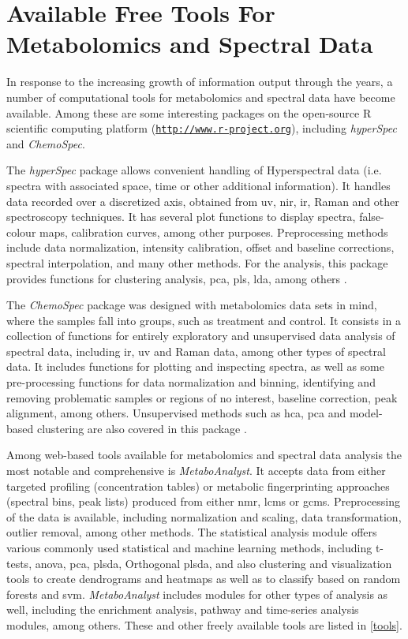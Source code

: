
\section{Available Free Tools For Metabolomics and Spectral Data} \label{met_tools}

In response to the increasing growth of information output through the years, a number of computational tools for metabolomics and spectral data have become available. Among these are some interesting packages on the open-source R scientific computing platform (\href{http://www.r-project.org}{\nolinkurl{http://www.r-project.org}}), including \textit{hyperSpec} and \textit{ChemoSpec}. 

The \textit{hyperSpec} package allows convenient handling of Hyperspectral data (i.e. spectra with associated space, time or other additional information). It handles data recorded over a discretized axis, obtained from \gls{uv}, \gls{nir}, \gls{ir}, Raman and other spectroscopy techniques. It has several plot functions to display spectra, false-colour maps, calibration curves, among other purposes. Preprocessing methods include data normalization, intensity calibration, offset and baseline corrections, spectral interpolation, and many other methods. For the analysis, this package provides functions for clustering analysis, \gls{pca}, \gls{pls}, \gls{lda}, among others \citep{hyperspec}.

The \textit{ChemoSpec} package was designed with metabolomics data sets in mind, where the samples fall into groups, such as treatment and control. It consists in a collection of functions for entirely exploratory and unsupervised data analysis of spectral data, including \gls{ir}, \gls{uv} and Raman data, among other types of spectral data. It includes functions for plotting and inspecting spectra, as well as some pre-processing functions for data normalization and binning, identifying and removing problematic samples or regions of no interest, baseline correction, peak alignment, among others. Unsupervised methods such as \gls{hca}, \gls{pca} and model-based clustering are also covered in this package \citep{chemospec}.

Among web-based tools available for metabolomics and spectral data analysis the most notable and comprehensive is \textit{MetaboAnalyst}. It accepts data from either targeted profiling (concentration tables) or metabolic fingerprinting approaches (spectral bins, peak lists) produced from either \gls{nmr}, \gls{lcms} or \gls{gcms}. Preprocessing of the data is available, including normalization and scaling, data transformation, outlier removal, among other methods. The statistical analysis module offers various commonly used statistical and machine learning methods, including t-tests, \gls{anova}, \gls{pca}, \gls{plsda}, Orthogonal \gls{plsda}, and also clustering and visualization tools to create dendrograms and heatmaps as well as to classify based on random forests and \gls{svm}. \textit{MetaboAnalyst} includes modules for other types of analysis as well, including the enrichment analysis, pathway and time-series analysis modules, among others. These and other freely available tools are listed in \autoref{tools}. 

